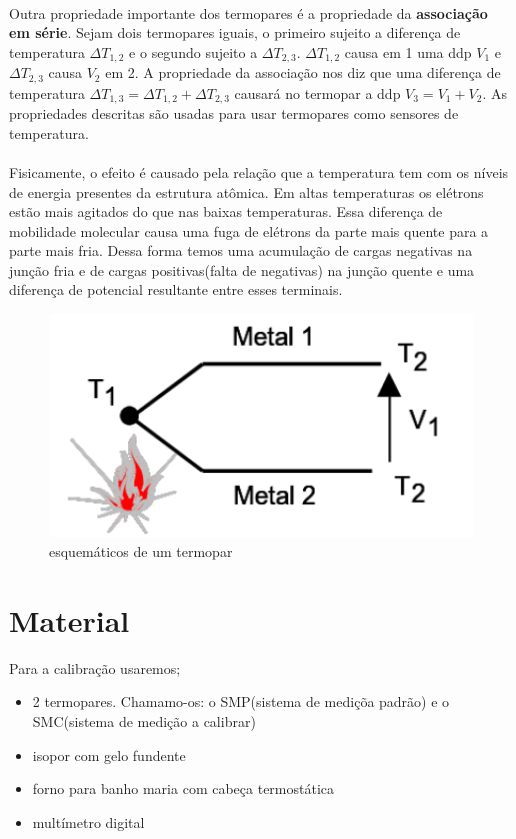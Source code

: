 \documentclass[a4paper,11pt]{article}
\begin{document}
\paragraph{} Outra propriedade importante dos termopares é a propriedade da \textbf{associação
em série}. Sejam dois termopares iguais,
o primeiro sujeito a diferença de temperatura $\Delta T_{1,2}$ e 
o segundo sujeito a $\Delta T_{2,3}$. $\Delta T_{1,2}$ causa em 1 uma ddp $V_1$
 e $\Delta T_{2,3}$ causa
$V_2$ em 2. A propriedade da associação nos diz que uma diferença de temperatura 
$\Delta T_{1,3} = \Delta T_{1,2} + \Delta T_{2,3}$ causará
 no termopar a ddp $V_3 = V_1 + V_2$. 
As propriedades descritas são usadas para usar termopares como sensores de temperatura. 

\paragraph{}Fisicamente, o efeito é causado pela relação que a temperatura tem com 
os níveis de energia presentes da estrutura atômica. Em altas temperaturas os elétrons
estão mais agitados do que nas baixas temperaturas. Essa diferença de mobilidade molecular
causa uma fuga de elétrons da parte mais quente para a parte mais fria. Dessa forma temos
uma acumulação de cargas negativas na junção fria e de cargas positivas(falta de negativas)
na junção quente e uma diferença de potencial resultante entre esses terminais. 

\begin{figure}[h]
\centering
\includegraphics[scale=0.5]{./../images/termopar.png}
\caption{esquemáticos de um termopar}
\label{fig:termopar}
\end{figure}

\newpage

\section{Material}
Para a calibração usaremos;
\begin{itemize}
	\item 2 termopares. Chamamo-os: o SMP(sistema de mediçõa padrão) e o SMC(sistema de medição a calibrar)
	\item isopor com gelo fundente
	\item forno para banho maria com cabeça termostática
	\item multímetro digital
\end{itemize}
\end{document}

